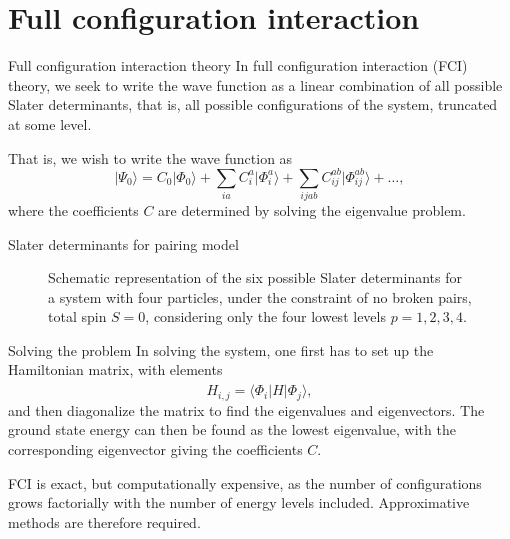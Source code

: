 \documentclass[UKenglish,aspectratio=169]{beamer}
\begin{document}
\section{Full configuration interaction}

\begin{frame}{Full configuration interaction theory}
    In full configuration interaction (FCI) theory, we seek to write
    the wave function as a linear combination of all possible Slater
    determinants, that is, all possible configurations of the system,
    truncated at some level.

    \bigskip

    That is, we wish to write the wave function as
    \begin{equation}
        \lvert \Psi_0 \rangle
        = C_0 \lvert \Phi_0 \rangle
        + \sum_{ia} C_i^a \lvert \Phi_i^a \rangle
        + \sum_{ijab} C_{ij}^{ab} \lvert \Phi_{ij}^{ab} \rangle
        + \ldots,
    \end{equation}
    where the coefficients $C$ are determined by solving the eigenvalue problem.
\end{frame}

\begin{frame}{Slater determinants for pairing model}
    \begin{figure}[htbp]
        \centering
        
        \caption{
            Schematic representation of the six possible Slater
            determinants for a system with four particles, under the
            constraint of no broken pairs, total spin $S = 0$,
            considering only the four lowest levels $p = 1, 2, 3,
            4$.\label{fig:SDs}
        }
    \end{figure}
\end{frame}

\begin{frame}{Solving the problem}
    In solving the system, one first has to set up the Hamiltonian
    matrix, with elements
    \begin{equation}
        H_{i, j} = \langle \Phi_i \lvert \hat{H} \rvert \Phi_j \rangle,
    \end{equation}
    and then diagonalize the matrix to find the eigenvalues and eigenvectors.
    The ground state energy can then be found as the lowest
    eigenvalue, with the corresponding eigenvector giving the coefficients $C$.

    \bigskip

    FCI is exact, but computationally expensive, as the number of
    configurations grows factorially with the number of energy levels included.
    Approximative methods are therefore required.
\end{frame}
\end{document}
